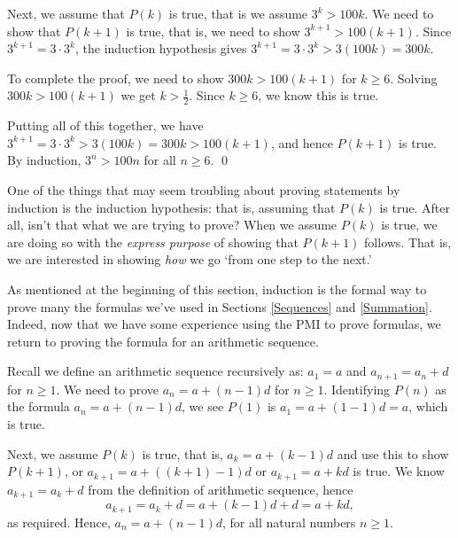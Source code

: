 \documentclass{ximera}
\begin{document}
\begin{example}
\begin{enumerate}
 

Next, we assume that $P(k)$ is true, that is we assume $3^{k} > 100k$.  We need to show that $P(k+1)$ is true, that is, we need to show $3^{k+1} > 100(k+1)$.  Since $3^{k+1} = 3 \cdot 3^{k}$, the induction hypothesis gives $3^{k+1} = 3 \cdot 3^{k} > 3(100k) = 300k$.  

 

To complete the proof, we need to show $300k > 100(k+1)$ for $k \geq 6$. Solving $300k > 100(k+1)$ we get $k > \frac{1}{2}$.  Since $k \geq 6$, we know this is true.  

 

Putting all of this together, we have $3^{k+1} = 3 \cdot 3^{k} > 3(100k) = 300k > 100(k+1)$, and hence $P(k+1)$ is true.  By induction, $3^{n} > 100n$ for all $n \geq 6$.  \qed

\end{enumerate}

\end{example}

One of the things that may seem troubling about proving statements by induction is the induction hypothesis:  that is, assuming that $P(k)$ is true.  After all, isn't that what we are trying to prove?   When we assume $P(k)$ is true, we are doing so with the \textit{express purpose} of showing that $P(k+1)$ follows. That is, we are interested in showing \textit{how} we go `from one step to the next.'  

 

As mentioned at the beginning of this section, induction is the formal way to prove many the formulas we've used in Sections \ref{Sequences} and \ref{Summation}.  Indeed, now that we have some experience using the PMI to prove formulas, we return to proving the formula for an arithmetic sequence.

 

Recall we define an arithmetic sequence recursively as:  $a_{1} = a$ and $a_{n+1} = a_{n} + d$ for $n \geq 1$.  We need to prove $a_{n} = a + (n-1) d$ for $n \geq 1$.  Identifying $P(n)$ as the formula $a_{n} = a + (n-1)d$, we see $P(1)$ is $a_{1} = a + (1-1) d = a$, which is true.  
 

Next, we assume $P(k)$ is true, that is, $a_{k} = a + (k-1)d$ and use this to show  $P(k+1)$, or $a_{k+1} = a+((k+1)-1)d$ or $a_{k+1} = a + kd$ is true.  We know $a_{k+1} = a_{k} + d$ from the definition of arithmetic sequence, hence \[ a_{k+1} = a_{k} + d = a + (k-1)d + d= a + kd,\]
as required.  Hence, $a_{n} = a + (n-1)d$, for all natural numbers $n \geq 1$.
\end{document}
